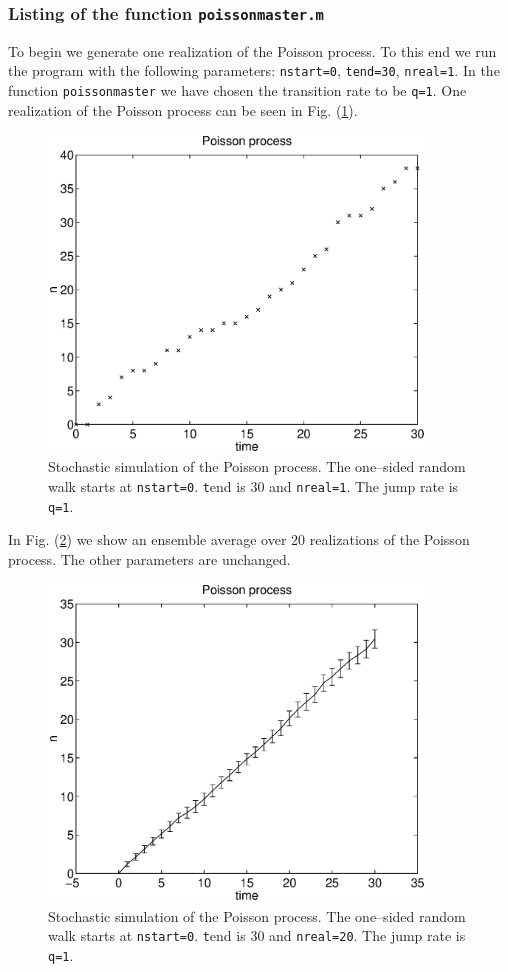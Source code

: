 \subsubsection{Listing of the function {\texttt{poissonmaster.m}}}

To begin we generate one realization of the Poisson process. To 
this end we run the program with the following parameters:
\texttt{nstart=0}, \texttt{tend=30}, \texttt{nreal=1}. In the 
function \texttt{poissonmaster} we have chosen the transition rate
to be \texttt{q=1}. One realization of the Poisson process can be
seen in Fig. (\ref{F_OS_POI_R}).
\begin{figure}
\label{F_OS_POI_R}
\includegraphics[width=10cm]{./Figures/f_os_poi_r.eps}
\caption{Stochastic simulation of the Poisson process. The 
one--sided random walk starts at \texttt{nstart=0}.  
{\texttt tend} is 30 and \texttt{nreal=1}.
The jump rate is \texttt{q=1}.}
\end{figure}  
In Fig. (\ref{F_OS_POI_1}) we show an ensemble average over 20
realizations of the Poisson process. The other parameters are 
unchanged.
\begin{figure}
\label{F_OS_POI_1}
\includegraphics[width=10cm]{./Figures/f_os_poi_1.eps}
\caption{Stochastic simulation of the Poisson process. The 
one--sided random walk starts at \texttt{nstart=0}.  
{\texttt tend} is 30 and \texttt{nreal=20}.
The jump rate is \texttt{q=1}.}
\end{figure}
